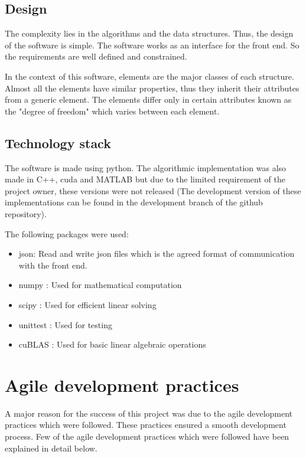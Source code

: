 \documentclass[12pt]{article}
\begin{document}
\subsection{Design}
The complexity lies in the algorithms and the data structures. Thus, the design of the software is simple. The software works as an interface for the front end. So the requirements are well defined and constrained.

In the context of this software, elements are the major classes of each structure. Almost all the elements have similar properties, thus they inherit their attributes from a generic element. The elements differ only in certain attributes known as the "degree of freedom" which varies between each element.

\subsection{Technology stack}

The software is made using python. The algorithmic implementation was also made in C++, cuda and MATLAB but due to the limited requirement of the project owner, these versions were not released (The development version of these implementations can be found in the development branch of the github repository).

The following packages were used:
\begin{itemize}
    \item json: Read and write json files which is the agreed format of communication with the front end.
    \item numpy : Used for mathematical computation
    \item scipy : Used for efficient linear solving
    \item unittest : Used for testing
    \item cuBLAS : Used for basic linear algebraic operations
\end{itemize}


\section{Agile development practices}

A major reason for the success of this project was due to the agile development practices which were followed. These practices ensured a smooth development process. Few of the agile development practices which were followed have been explained in detail below.
\end{document}
